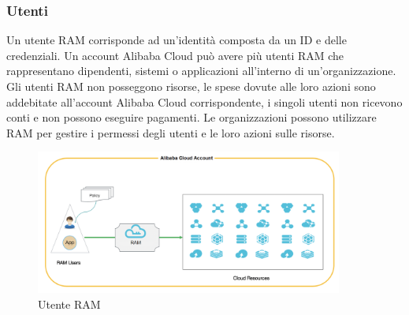 \documentclass[a4paper]{article}
\begin{document}
\subsubsection{Utenti}
Un utente RAM corrisponde ad un'identità composta da un ID e delle credenziali. Un account Alibaba Cloud può avere più utenti RAM che rappresentano dipendenti, sistemi o applicazioni all'interno di un'organizzazione. Gli utenti RAM non posseggono risorse, le spese dovute alle loro azioni sono addebitate all'account Alibaba Cloud corrispondente, i singoli utenti non ricevono conti e non possono eseguire pagamenti. Le organizzazioni possono utilizzare RAM per gestire i permessi degli utenti e le loro azioni sulle risorse.\cite{alibaba_users}
\begin{figure}[ht]
    \centering
    \includegraphics[width=0.9\textwidth]{Risorse/alibaba_user_permission.png}
    \caption{Utente RAM}
\end{figure}\\

\end{document}
